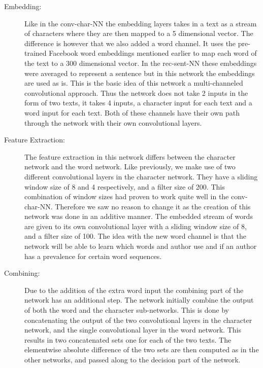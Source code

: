 \begin{description}

    \item[Embedding:]

        Like in the \gls{conv-char-NN} the embedding layers takes in a text as
        a stream of characters where they are then mapped to a 5 dimensional
        vector. The difference is however that we also added a word channel.
        It uses the pre-trained Facebook word embeddings mentioned earlier
        to map each word of the text to a 300 dimensional vector. In the
        \gls{rec-sent-NN} these embeddings were averaged to represent a sentence
        but in this network the embeddings are used as is. This is the basic
        idea of this network a multi-channeled convolutional approach. Thus the
        network does not take 2 inputs in the form of two texts, it takes 4
        inputs, a character input for each text and a word input for each text.
        Both of these channels have their own path through the network with
        their own convolutional layers.

    \item[Feature Extraction:]

        The feature extraction in this network differs between the character
        network and the word network. Like previously, we make use of two
        different convolutional layers in the character network. They have a
        sliding window size of 8 and 4 respectively, and a filter size of 200.
        This combination of window sizes had proven to work quite well in the
        \gls{conv-char-NN}. Therefore we saw no reason to change it as the
        creation of this network was done in an additive manner. The embedded
        stream of words are given to its own convolutional layer with a sliding
        window size of 8, and a filter size of 100. The idea with the new word
        channel is that the network will be able to learn which words and author
        use and if an author has a prevalence for certain word sequences.

    \item[Combining:]

        Due to the addition of the extra word input the combining part of
        the network has an additional step. The network initially combine
        the output of both the word and the character sub-networks. This is
        done by concatenating the output of the two convolutional layers in
        the character network, and the single convolutional layer in the word
        network. This results in two concatenated sets one for each of the two
        texts. The elementwise absolute difference of the two sets are then
        computed as in the other networks, and passed along to the decision part
        of the network.


\end{description}
